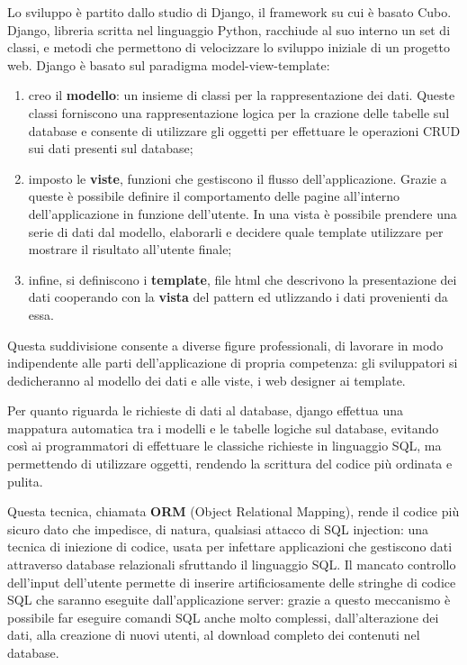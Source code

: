 \documentclass[12pt,a4paper]{article}
\begin{document}
Lo sviluppo è partito dallo studio di Django, il framework su cui è basato Cubo.
Django, libreria scritta nel linguaggio Python, racchiude al suo interno un set di classi, e metodi che permettono di velocizzare lo sviluppo iniziale di un progetto web. Django è basato sul paradigma model-view-template:
\begin{enumerate}
    \item creo il \textbf{modello}: un insieme di classi per la rappresentazione dei dati. Queste classi forniscono una rappresentazione logica per la crazione delle tabelle sul database e consente di utilizzare gli oggetti per effettuare le operazioni CRUD sui dati presenti sul database;
    \item imposto le \textbf{viste}, funzioni che gestiscono il flusso dell’applicazione. Grazie a queste è possibile definire il comportamento delle pagine all’interno dell’applicazione in funzione dell'utente. In una vista è possibile prendere una serie di dati dal modello, elaborarli e decidere quale template utilizzare per mostrare il risultato all’utente finale;
    \item infine, si definiscono i \textbf{template}, file html che descrivono la presentazione dei dati cooperando con la \textbf{vista} del pattern ed utlizzando i dati provenienti da essa.
\end{enumerate}

Questa suddivisione consente a diverse figure professionali, di lavorare in modo indipendente alle parti dell’applicazione di propria competenza: gli sviluppatori si dedicheranno al modello dei dati e alle viste, i web designer ai template.

Per quanto riguarda le richieste di dati al database, django effettua una mappatura automatica tra i modelli e le tabelle logiche sul database, evitando così ai programmatori di effettuare le classiche richieste in linguaggio SQL, ma permettendo di utilizzare oggetti, rendendo la scrittura del codice più ordinata e pulita.

Questa tecnica, chiamata \textbf{ORM} (Object Relational Mapping), rende il codice più sicuro dato che impedisce, di natura, qualsiasi attacco di SQL injection: una tecnica di iniezione di codice, usata per infettare applicazioni che gestiscono dati attraverso database relazionali sfruttando il linguaggio SQL. Il mancato controllo dell'input dell'utente permette di inserire artificiosamente delle stringhe di codice SQL che saranno eseguite dall'applicazione server: grazie a questo meccanismo è possibile far eseguire comandi SQL anche molto complessi, dall'alterazione dei dati, alla creazione di nuovi utenti, al download completo dei contenuti nel database.
\end{document}
